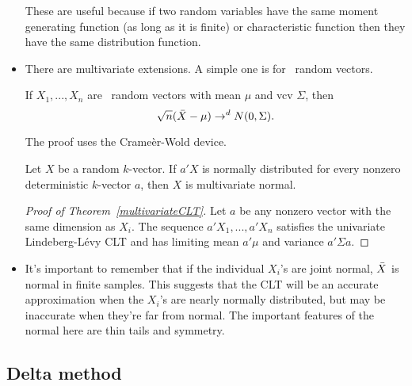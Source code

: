 \begin{itemize}
  These are useful because if two random variables have the same
  moment generating function (as long as it is finite) or
  characteristic function then they have the same distribution
  function.

\item There are multivariate extensions.  A simple one is for \iid\
  random vectors.
  \begin{thm}\label{multivariateCLT}
    If $X_1,...,X_n$ are \iid\ random vectors with mean $\mu$ and vcv $\Sigma$,
    then
    \begin{equation*}
      \sqrt{n}(\bar{X} - \mu) \to^d N(0,\Sigma).
    \end{equation*}
  \end{thm}

  The proof uses the Crame\`er-Wold device.
  \begin{thm}
    Let $X$ be a random $k$-vector.  If $a'X$ is normally distributed
    for every nonzero deterministic $k$-vector $a$, then $X$ is
    multivariate normal.
  \end{thm}

  \begin{proof}[Proof of Theorem~\ref{multivariateCLT}]
    Let $a$ be any nonzero vector with the same dimension as $X_i$.
    The sequence $a'X_1,...,a'X_n$ satisfies the univariate
    Lindeberg-L\'evy CLT and has limiting mean $a'\mu$ and variance
    $a'\Sigma a$.
\end{proof}

\item It's important to remember that if the individual $X_i$'s are
  joint normal, $\bar{X}$ is normal in finite samples.  This suggests that
  the CLT will be an accurate approximation when the $X_i$'s are
  nearly normally distributed, but may be inaccurate when they're far
  from normal.  The important features of the normal here are thin
  tails and symmetry.

\end{itemize}

\subsection{Delta method}

